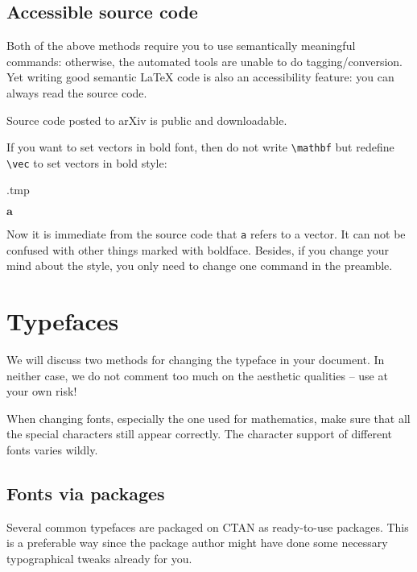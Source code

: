 %
%
\subsection{Accessible source code}

Both of the above methods require you to use semantically meaningful commands:
otherwise, the automated tools are unable to do tagging/conversion.
Yet writing good semantic \LaTeX{} code is also an accessibility feature:
you can always read the source code.

\begin{remark}
Source code posted to arXiv is public and downloadable.
\end{remark}

If you want to set vectors in bold font, then do not write \verb|\mathbf| but
redefine \verb|\vec| to set vectors in bold style:
%
\begin{VerbatimOut}{\jobname.tmp}
\renewcommand{\vec}{\mathbf}

$\vec a$
\end{VerbatimOut}
\ShowExample
%
Now it is immediate from the source code that \verb|a| refers to a vector.
It can not be confused with other things marked with boldface.
Besides, if you change your mind about the style,
you only need to change one command in the preamble.


%
%
%
\section{Typefaces}\label{sec:typefaces}

We will discuss two methods for changing the typeface in your document.
In neither case, we do not comment too much on the aesthetic qualities
-- use at your own risk!

\begin{warning}
When changing fonts, especially the one used for mathematics,
make sure that all the special characters still appear correctly.
The character support of different fonts varies wildly.
\end{warning}


%
%
\subsection{Fonts via packages}

Several common typefaces are packaged on CTAN as ready-to-use packages.
This is a preferable way since the package author might have done some necessary
typographical tweaks already for you.

